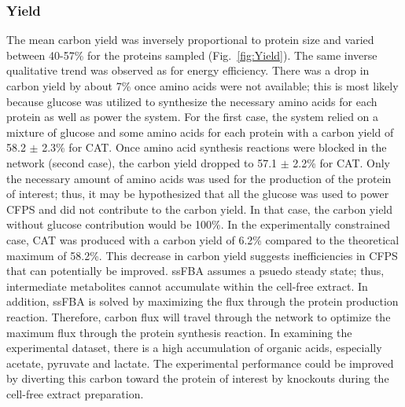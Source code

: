 \documentclass[journal=asbcd6,manuscript=article]{achemso}
\begin{document}
\subsubsection{Yield}
The mean carbon yield was inversely proportional to protein size and varied between 40-57\% for the proteins sampled (Fig.~\ref{fig:Yield}).
The same inverse qualitative trend was observed as for energy efficiency.
There was a drop in carbon yield by about 7\% once amino acids were not available; this is most likely because glucose was utilized to synthesize the necessary amino acids for each protein as well as power the system.
For the first case, the system relied on a mixture of glucose and some amino acids for each protein with a carbon yield of 58.2 $\pm$ 2.3\% for CAT.
Once amino acid synthesis reactions were blocked in the network (second case), the carbon yield dropped to 57.1 $\pm$ 2.2\% for CAT.
Only the necessary amount of amino acids was used for the production of the protein of interest; thus, it may be hypothesized that all the glucose was used to power CFPS and did not contribute to the carbon yield.
In that case, the carbon yield without glucose contribution would be 100\%.
In the experimentally constrained case, CAT was produced with a carbon yield of 6.2\% compared to the theoretical maximum of 58.2\%.
This decrease in carbon yield suggests inefficiencies in CFPS that can potentially be improved.
ssFBA assumes a psuedo steady state; thus, intermediate metabolites cannot accumulate within the cell-free extract.
In addition, ssFBA is solved by maximizing the flux through the protein production reaction.
Therefore, carbon flux will travel through the network to optimize the maximum flux through the protein synthesis reaction.
In examining the experimental dataset, there is a high accumulation of organic acids, especially acetate, pyruvate and lactate.
The experimental performance could be improved by diverting this carbon toward the protein of interest by knockouts during the cell-free extract preparation.
\end{document}
